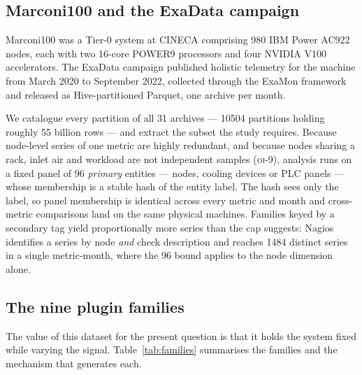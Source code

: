 \documentclass[11pt,a4paper]{article}
\newcommand{\num}[1]{#1}
\newcommand{\oi}[1]{\textsc{oi-#1}}
\begin{document}
\subsection{Marconi100 and the ExaData campaign}

Marconi100 was a Tier-0 system at CINECA comprising 980 IBM Power AC922 nodes,
each with two 16-core POWER9 processors and four NVIDIA V100 accelerators. The
ExaData campaign published holistic telemetry for the machine from March 2020 to
September 2022, collected through the ExaMon framework and released as
Hive-partitioned Parquet, one archive per month.

We catalogue every partition of all 31 archives --- \num{10504} partitions
holding roughly \num{55} billion rows --- and extract the subset the study
requires. Because node-level series of one metric are highly redundant, and
because nodes sharing a rack, inlet air and workload are not independent
samples (\oi{9}), analysis runs on a fixed panel of \num{96} \emph{primary}
entities --- nodes, cooling devices or PLC panels --- whose membership is a
stable hash of the entity label. The hash sees only the label, so panel
membership is identical across every metric and month and cross-metric
comparisons land on the same physical machines. Families keyed by a secondary
tag yield proportionally more series than the cap suggests: Nagios identifies a
series by node \emph{and} check description and reaches \num{1484} distinct
series in a single metric-month, where the \num{96} bound applies to the node
dimension alone.

\subsection{The nine plugin families}
\label{sec:families}

The value of this dataset for the present question is that it holds the system
fixed while varying the signal. Table~\ref{tab:families} summarises the
families and the mechanism that generates each.
\end{document}
